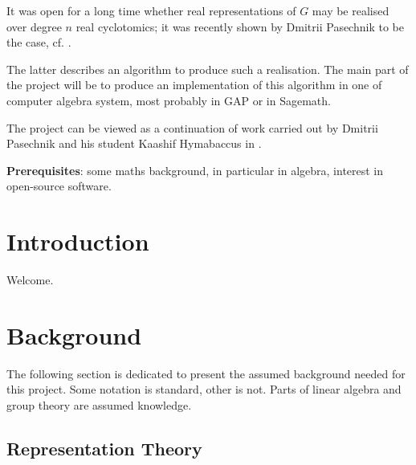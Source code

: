 \documentclass[11pt]{article}
\begin{document}
It was open for a long time whether real representations of $G$ may be realised
over degree $n$ real cyclotomics; it was recently shown by Dmitrii Pasechnik to be
the case, cf. \cite{Pas21}.

The latter describes an algorithm to produce such a realisation. The main part of the
project will be to produce an implementation of this algorithm in one of computer
algebra system, most probably in GAP or in Sagemath.

The project can be viewed as a continuation of work carried out by Dmitrii Pasechnik
and his student Kaashif Hymabaccus in \cite{Hymabaccus2020}.

\textbf{Prerequisites}: some maths background, in particular in algebra, interest in open-source software.

\newpage

\tableofcontents

\newpage

\section{Introduction}

Welcome.

\section{Background}

The following section is dedicated to present the assumed background needed for this project.
Some notation is standard, other is not. Parts of linear algebra and group theory are assumed knowledge.

\subsection{Representation Theory}
\end{document}
